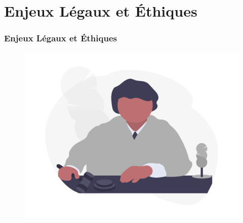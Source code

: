\documentclass[9pt]{beamer}
\begin{document}
\section{Enjeux Légaux et Éthiques}
\begin{frame}
	\frametitle{Enjeux Légaux et Éthiques}
	\begin{figure}[!htb]
     \centering
     \includegraphics[width=.8\textwidth]{../media/judge}
   \label{Fig:judge}
\end{figure}
\end{frame}
\end{document}
